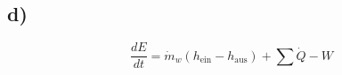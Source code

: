 

\subsection*{d)}

\[
\frac{dE}{dt} = \dot{m}_w (h_{\text{ein}} - h_{\text{aus}}) + \sum \dot{Q} - W
\]